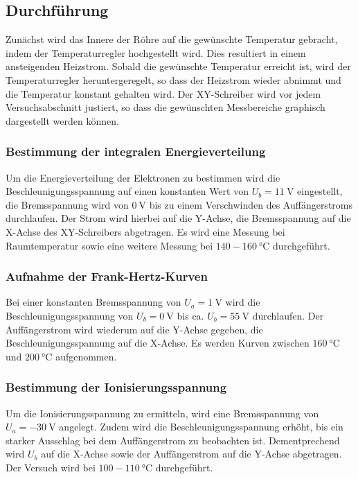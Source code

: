 \subsection{Durchführung}
\label{sec:durchführung}
Zunächst wird das Innere der Röhre auf die gewünschte Temperatur gebracht, indem der Temperaturregler hochgestellt wird.
Dies resultiert in einem ansteigenden Heizstrom.
Sobald die gewünschte Temperatur erreicht ist, wird der Temperaturregler heruntergeregelt, so dass der Heizstrom wieder abnimmt und die Temperatur konstant gehalten wird.
Der XY-Schreiber wird vor jedem Versuchsabschnitt justiert, so dass die gewünschten Messbereiche graphisch dargestellt werden können.

\subsubsection{Bestimmung der integralen Energieverteilung}
Um die Energieverteilung der Elektronen zu bestimmen wird die Beschleunigungsspannung auf einen konstanten Wert von $U_b = \SI{11}{\volt}$ eingestellt, die Bremsspannung wird von $\SI{0}{\volt}$ bis zu einem Verschwinden des Auffängerstroms durchlaufen.
Der Strom wird hierbei auf die Y-Achse, die Bremsspannung auf die X-Achse des XY-Schreibers abgetragen.
Es wird eine Messung bei Raumtemperatur sowie eine weitere Messung bei $\si{140}-\SI{160}{\celsius}$ durchgeführt.


\subsubsection{Aufnahme der Frank-Hertz-Kurven}
Bei einer konstanten Bremsspannung von $U_a = \SI{1}{\volt}$ wird die Beschleunigungsspannung von $U_b = \SI{0}{\volt}$ bis ca. $U_b = \SI{55}{\volt}$ durchlaufen.
Der Auffängerstrom wird wiederum auf die Y-Achse gegeben, die Beschleunigungsspannung auf die X-Achse.
Es werden Kurven zwischen $\SI{160}{\celsius}$ und $\SI{200}{\celsius}$ aufgenommen.


\subsubsection{Bestimmung der Ionisierungsspannung}
Um die Ionisierungsspannung zu ermitteln, wird eine Bremsspannung von $U_a = \SI{-30}{\volt}$ angelegt.
Zudem wird die Beschleunigungsspannung erhöht, bis ein starker Ausschlag bei dem Auffängerstrom zu beobachten ist.
Dementprechend wird $U_b$ auf die X-Achse sowie der Auffängerstrom auf die Y-Achse abgetragen.
Der Versuch wird bei $\si{100}-\SI{110}{\celsius}$ durchgeführt.
